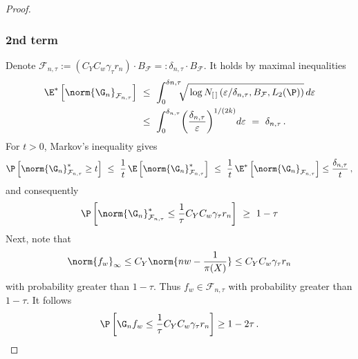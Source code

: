 \begin{proof}
\subsubsection*{2nd term}
Denote
$
  \mathcal{F}_{n,\tau}
  :=
  (
  C_Y
  C_w
  \gamma_\tau
  r_n
  )
  \cdot
  B_\mathcal{F}
  =:
  \delta_{n,\tau}
  \cdot
  B_\mathcal{F}
$.
It holds by maximal inequalities
\begin{align*}
  \E^*\left[ 
    \norm{\G_n}_{\mathcal{F}_{n,\tau}}
  \right]
  &
  \ 
  \le
  \ 
  \int_0^{\delta{n,\tau}}
  \!\!\!
  \sqrt{
    \,
    \log 
    N_{[\,]}
    \left( 
      \varepsilon / \delta_{n,\tau}
    ,
    B_{\mathcal{F}}
    ,
    L_2(\P)
    \right)
  }
  \,
  d\varepsilon
  \\
  &
  \ 
  \le
  \ 
  \int_0^{\delta_{n,\tau}}
  \!
  \left( 
    \frac{\delta_{n,\tau}}{\varepsilon}
  \right)^{1/(2k)}
  \!
  d \varepsilon
  \ 
  =
  \ 
  \delta_{n,\tau}
  \,.
\end{align*}
For $t>0$,
Markov's inequality gives
\begin{gather}
  \P\left[
  \norm{\G_n}^*_{\mathcal{F}_{n,\tau}}
   \ge t
  \right]
  \ 
  \le
  \ 
  \frac{1
  }{t}
  \,
    \E\left[
  \norm{\G_n}^*_{\mathcal{F}_{n,\tau}}
    \right]
  \ 
  \le
  \ 
  \frac{1
  }{t}
  \,
    \E^*\left[
  \norm{\G_n}_{\mathcal{F}_{n,\tau}}
    \right]
    \le
    \frac{\delta_{n,\tau}}{t}
    \,,
\end{gather}
and consequently
\begin{gather}
  \P\left[
  \norm{\G_n}^*_{\mathcal{F}_{n,\tau}}
  \le 
  \frac{1}{\tau}
  C_Y
  C_w
  \gamma_\tau
  r_n
  \right]
  \ 
  \ge
  \ 
  1-\tau
\end{gather}
Next, note that
\begin{gather}
  \norm{f_w}_\infty
  \le
  C_Y
  \norm{nw- \frac{1}{\pi(X)}}
  \le
  C_Y
  C_w
  \gamma_\tau
  r_n
\end{gather}
with probability greater than $1-\tau$.
Thus 
$
f_w \in \mathcal{F}_{n,\tau}
$
with probability greater than $1-\tau$.
It follows
\begin{gather}
  \P
  \left[
  \G_n f_w \le 
  \frac{1}{\tau}
  C_Y
  C_w
  \gamma_\tau
  r_n
  \right]
  \ge
  1 - 2\tau
  \,.
\end{gather}

\end{proof}
